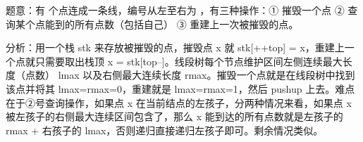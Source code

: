 题意：有  个点连成一条线，编号从左至右为 ，有三种操作：① 摧毁一个点 ② 查询某个点能到的所有点数（包括自己） ③ 重建上一次被摧毁的点。

分析：用一个栈 stk 来存放被摧毁的点，摧毁点 x 就 stk[++top] = x，重建上一个点就只需要取出栈顶 x = stk[top--]。线段树每个节点维护区间左侧连续最大长度（点数） lmax 以及右侧最大连续长度 rmax。摧毁一个点就是在线段树中找到该点并将其 lmax=rmax=0，重建就是 lmax=rmax=1，然后 pushup 上去。难点在于②号查询操作，如果点 x 在当前结点的左孩子，分两种情况来看，如果点 x 被左孩子的右侧最大连续区间包含了，那么 x 能到达的所有点数就是左孩子的 rmax + 右孩子的 lmax，否则递归直接递归左孩子即可。剩余情况类似。